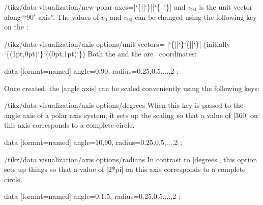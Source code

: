 \begin{key}{/tikz/data visualization/new polar axes=|\char`\{||\char`\}||\char`\{||\char`\}|}
    and $v_{90}$ is the unit vector along ``$90^\circ$-axis''. The values of
    $v_0$ and $v_{90}$ can be changed using the following key on the
    :
    \begin{key}{/tikz/data visualization/axis options/unit vectors=%
            |\char`\{||\char`\}\char`\{||\char`\}|
            (initially {\char`\{(1pt,0pt)\char`\}\char`\{(0pt,1pt)\char`\}})%
    }
    Both the  and the 
    are \tikzname\ coordinates:
\begin{codeexample}[]
\tikz \datavisualization
    [new polar axes={angle axis}{radius axis},
     radius axis={unit length=1cm},
     angle axis={unit vectors={(10:1pt)}{(60:1pt)}},
     visualize as scatter]
  data [format=named] {
    angle={0,90}, radius={0.25,0.5,...,2}
  };
\end{codeexample}
    \end{key}
\end{key}

Once created, the |angle axis| can be scaled conveniently using the following
keys:

\begin{key}{/tikz/data visualization/axis options/degrees}
    When this key is passed to the angle axis of a polar axis system, it sets
    up the scaling so that a value of |360| on this axis corresponds to a
    complete circle.
\begin{codeexample}[]
\tikz \datavisualization
    [new polar axes={angle axis}{radius axis},
     radius axis={unit length=1cm},
     angle axis={degrees},
     visualize as scatter]
  data [format=named] {
    angle={10,90}, radius={0.25,0.5,...,2}
  };
\end{codeexample}
\end{key}

\begin{key}{/tikz/data visualization/axis options/radians}
    In contrast to |degrees|, this option sets up things so that a value of
    |2*pi| on this axis corresponds to a complete circle.
\begin{codeexample}[]
\tikz \datavisualization
    [new polar axes={angle axis}{radius axis},
     radius axis={unit length=1cm},
     angle axis={radians},
     visualize as scatter]
  data [format=named] {
    angle={0,1.5}, radius={0.25,0.5,...,2}
  };
\end{codeexample}
\end{key}
